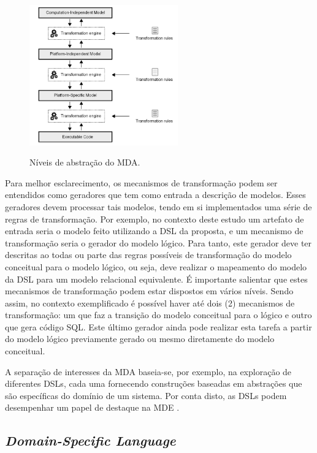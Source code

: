 \begin{figure}[htb]
	\centering
	\caption{Níveis de abstração do MDA.}
		\includegraphics[width=0.57\textwidth]{img/MDA_Process.png}
	\label{fig:MDALevels}
\end{figure}

Para melhor esclarecimento, os mecanismos de transformação podem ser entendidos como geradores que tem como entrada a descrição de modelos.
Esses geradores devem processar tais modelos, tendo em si implementados uma série de regras de transformação. 
Por exemplo, no contexto deste estudo um artefato de entrada seria o modelo feito utilizando a \ac{DSL} da proposta, e um mecanismo de transformação seria o gerador do modelo lógico. 
Para tanto, este gerador deve ter descritas ao todas ou parte das regras possíveis de transformação do modelo conceitual para o modelo lógico, ou seja, deve realizar o mapeamento do modelo da \ac{DSL} para um modelo relacional equivalente.
É importante salientar que estes mecanismos de transformação podem estar dispostos em vários níveis. 
Sendo assim, no contexto exemplificado é possível haver até dois (2) mecanismos de transformação: um que faz a transição do modelo conceitual para o lógico e outro que gera código \ac{SQL}.
Este último gerador ainda pode realizar esta tarefa a partir do modelo lógico previamente gerado ou mesmo diretamente do modelo conceitual. 

A separação de interesses da \ac{MDA} baseia-se, por exemplo, na exploração de diferentes \acp{DSL}, cada uma fornecendo construções baseadas em abstrações que são específicas do domínio de um sistema. 
Por conta disto, as \acp{DSL} podem desempenhar um papel de destaque na \ac{MDE} \cite{Schmidt:2006}.


    \subsection{\textit{Domain-Specific Language}} \label{ssec:DSL}
    
